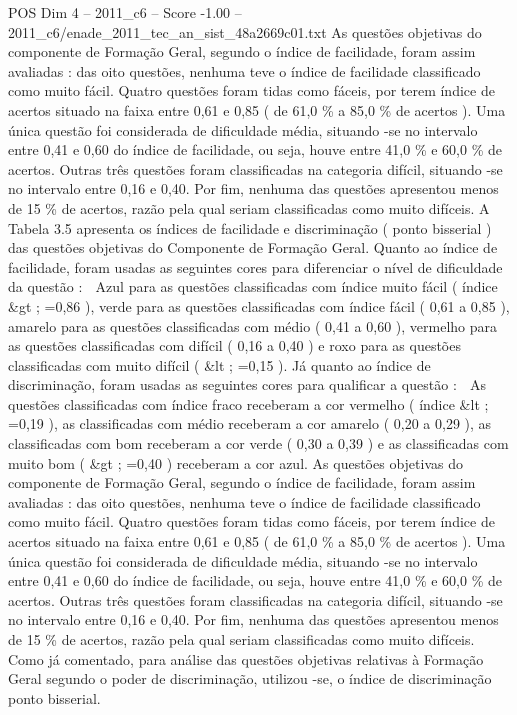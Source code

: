 \begin{textsample}{POS Dim 4 – 2011\_c6 – Score -1.00 – 2011\_c6/enade\_2011\_tec\_an\_sist\_48a2669c01.txt}
As questões objetivas do componente de Formação Geral, segundo o índice de facilidade, foram assim avaliadas : das oito questões, nenhuma teve o índice de facilidade classificado como muito fácil.
Quatro questões foram tidas como fáceis, por terem índice de acertos situado na faixa entre 0,61 e 0,85 ( de 61,0 \% a 85,0 \% de acertos ).
Uma única questão foi considerada de dificuldade média, situando -se no intervalo entre 0,41 e 0,60 do índice de facilidade, ou seja, houve entre 41,0 \% e 60,0 \% de acertos.
Outras três questões foram classificadas na categoria difícil, situando -se no intervalo entre 0,16 e 0,40.
Por fim, nenhuma das questões apresentou menos de 15 \% de acertos, razão pela qual seriam classificadas como muito difíceis.
A Tabela 3.5 apresenta os índices de facilidade e discriminação ( ponto bisserial ) das questões objetivas do Componente de Formação Geral.
Quanto ao índice de facilidade, foram usadas as seguintes cores para diferenciar o nível de dificuldade da questão :  Azul para as questões classificadas com índice muito fácil ( índice \&gt ; =0,86 ), verde para as questões classificadas com índice fácil ( 0,61 a 0,85 ), amarelo para as questões classificadas com médio ( 0,41 a 0,60 ), vermelho para as questões classificadas com difícil ( 0,16 a 0,40 ) e roxo para as questões classificadas com muito difícil ( \&lt ; =0,15 ).
Já quanto ao índice de discriminação, foram usadas as seguintes cores para qualificar a questão :  As questões classificadas com índice fraco receberam a cor vermelho ( índice \&lt ; =0,19 ), as classificadas com médio receberam a cor amarelo ( 0,20 a 0,29 ), as classificadas com bom receberam a cor verde ( 0,30 a 0,39 ) e as classificadas com muito bom ( \&gt ; =0,40 ) receberam a cor azul.
As questões objetivas do componente de Formação Geral, segundo o índice de facilidade, foram assim avaliadas : das oito questões, nenhuma teve o índice de facilidade classificado como muito fácil.
Quatro questões foram tidas como fáceis, por terem índice de acertos situado na faixa entre 0,61 e 0,85 ( de 61,0 \% a 85,0 \% de acertos ).
Uma única questão foi considerada de dificuldade média, situando -se no intervalo entre 0,41 e 0,60 do índice de facilidade, ou seja, houve entre 41,0 \% e 60,0 \% de acertos.
Outras três questões foram classificadas na categoria difícil, situando -se no intervalo entre 0,16 e 0,40.
Por fim, nenhuma das questões apresentou menos de 15 \% de acertos, razão pela qual seriam classificadas como muito difíceis.
Como já comentado, para análise das questões objetivas relativas à Formação Geral segundo o poder de discriminação, utilizou -se, o índice de discriminação ponto bisserial.

\end{textsample}
